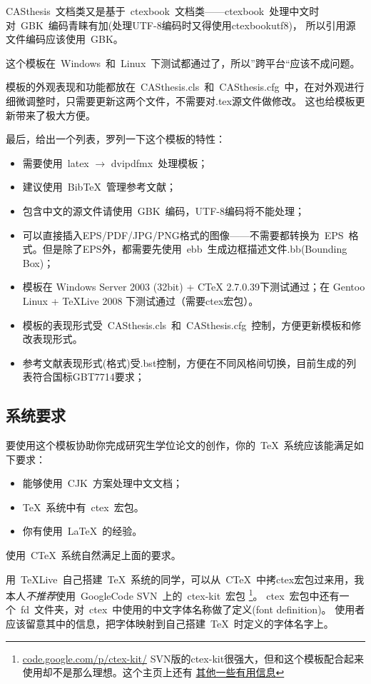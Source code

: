 CASthesis~文档类又是基于~ctexbook~文档类——ctexbook~处理中文时对~GBK~编码青睐有加(处理UTF-8编码时又得使用ctexbookutf8)，
所以引用源文件编码应该使用~GBK。

这个模板在~Windows~和~Linux~下测试都通过了，所以”跨平台“应该不成问题。

模板的外观表现和功能都放在~CASthesis.cls~和~CASthesis.cfg~中，在对外观进行细微调整时，只需要更新这两个文件，不需要对.tex源文件做修改。
这也给模板更新带来了极大方便。

最后，给出一个列表，罗列一下这个模板的特性：

\begin{itemize}
\item 需要使用~latex $\rightarrow$ dvipdfmx~处理模板；
\item 建议使用~BibTeX~管理参考文献；
\item 包含中文的源文件请使用~GBK~编码，UTF-8编码将不能处理；
\item 可以直接插入EPS/PDF/JPG/PNG格式的图像——不需要都转换为~EPS~格式。但是除了EPS外，都需要先使用~ebb~生成边框描述文件.bb(Bounding Box)；
\item 模板在 Windows Server 2003 (32bit) + CTeX 2.7.0.39下测试通过；在 Gentoo Linux + TeXLive 2008 下测试通过（需要ctex宏包）。
\item 模板的表现形式受~CASthesis.cls~和~CASthesis.cfg~控制，方便更新模板和修改表现形式。
\item 参考文献表现形式(格式)受.bst控制，方便在不同风格间切换，目前生成的列表符合国标GBT7714要求；
\end{itemize}

\subsection{系统要求}
\label{sec:requirements}

要使用这个模板协助你完成研究生学位论文的创作，你的~\TeX~系统应该能满足如下要求：

\begin{itemize}
\item 能够使用~CJK~方案处理中文文档；
\item \TeX~系统中有~ctex~宏包。
\item 你有使用~\LaTeX~的经验。
\end{itemize}

使用~CTeX~系统自然满足上面的要求。

 用~TeXLive~自己搭建~\TeX~系统的同学，可以从~CTeX~中拷ctex宏包过来用，我本人\emph{不推荐}使用~GoogleCode SVN~上的~ctex-kit~宏包
 \footnote{\url{code.google.com/p/ctex-kit/} SVN版的ctex-kit很强大，但和这个模板配合起来使用却不是那么理想。这个主页上还有
   \href{http://code.google.com/p/ctex-kit/wiki/SimpleChineseTemplates}{其他一些有用信息} }。
 ctex~宏包中还有一个~fd~文件夹，对~ctex~中使用的中文字体名称做了定义(font definition)。
 使用者应该留意其中的信息，把字体映射到自己搭建~TeX~时定义的字体名字上。
 
